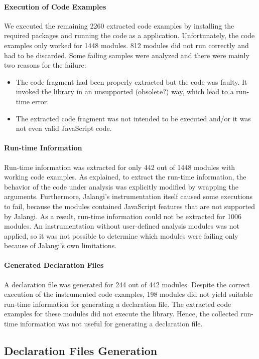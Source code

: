 \documentclass[english,cleveref,autoref,submission]{programming}
\begin{document}
\paragraph*{Execution of Code Examples}
We executed the remaining 2260 extracted code examples by installing the
required packages and running the code as a \NodeJS{}
application. Unfortunately, the code examples only worked for 1448
modules. 812 modules did not run correctly and had to be
discarded. Some failing samples were analyzed and there were mainly
two reasons for the failure: 
\begin{itemize}
\item The code fragment had been properly extracted but the code was
  faulty. It invoked the library in an unsupported
  (obsolete?) way, which lead to a run-time error.
\item The extracted code fragment was not intended to be executed
  and/or it was not even valid JavaScript code. 
\end{itemize}

\paragraph*{Run-time Information}
Run-time information was extracted for only 442 out of 1448 modules with working code
examples. As explained, to extract the run-time information, the behavior of the code
under analysis was explicitly modified by wrapping the arguments. Furthermore, Jalangi’s
instrumentation itself caused some executions to fail, because the modules contained
JavaScript features that are not supported by Jalangi. As a result, run-time information
could not be extracted for 1006 modules. An instrumentation without user-defined analysis
modules was not applied, so it was not possible to determine which modules were failing
only because of Jalangi’s own limitations. 

\paragraph*{Generated Declaration Files}
A declaration file was generated for 244 out of 442 modules. Despite the correct execution
of the instrumented code examples, 198 modules did not yield suitable run-time information
for generating a declaration file. The extracted code examples for these modules did not
execute the library. Hence, the collected run-time information was not useful
for generating a declaration file. 

\subsection{Declaration Files Generation}
\label{sec:experiments-declaration-files-generation}
\end{document}

